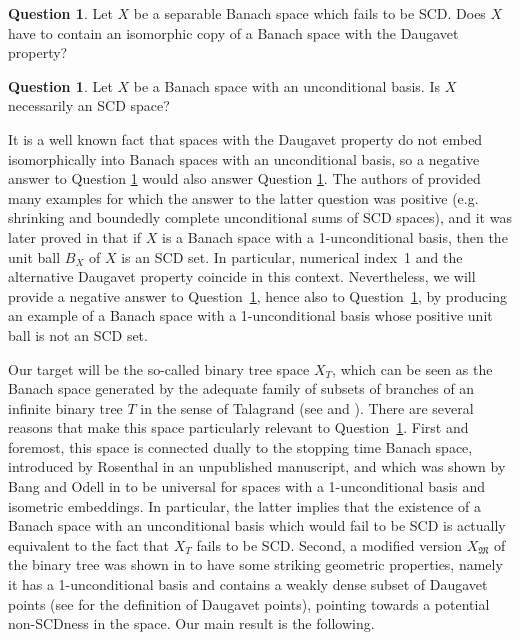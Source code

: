 \documentclass[11pt,a4paper,reqno]{amsart}
\numberwithin{equation}{section}
\newcommand{\1}{\mathbbm{1}}
\theoremstyle{plain}
\theoremstyle{definition}
\newtheorem{question}[theorem]{Question}
\begin{document}
\begin{question}\label{question:non_SCD_implies_isomorphic_copy_of_Daugavet_space}
    Let $X$ be a separable Banach space which fails to be SCD. Does $X$ have to contain an isomorphic copy of a Banach space with the Daugavet property?
\end{question}
\begin{question}\label{question:unconditional_basis_implies_SCD}
    Let $X$ be a Banach space with an unconditional basis. Is $X$ necessarily an SCD space? 
\end{question}
It is a well known fact that spaces with the Daugavet property do not embed isomorphically into Banach spaces with an unconditional basis, so a negative answer to Question \ref{question:unconditional_basis_implies_SCD} would also answer Question \ref{question:non_SCD_implies_isomorphic_copy_of_Daugavet_space}. The authors of \cite{AKMMS10} provided many examples for which the answer to the latter question was positive (e.g. shrinking and boundedly complete unconditional sums of SCD spaces), and it was later proved in \cite{KMMW2013} that if $X$ is a Banach space with a 1-unconditional basis, then the unit ball $B_X$ of $X$ is an SCD set. In particular, numerical index~1 and the alternative Daugavet property coincide in this context. Nevertheless, we will provide a negative answer to Question~\ref{question:unconditional_basis_implies_SCD}, hence also to Question~\ref{question:non_SCD_implies_isomorphic_copy_of_Daugavet_space}, by producing an example of a Banach space with a 1-unconditional basis whose positive unit ball is not an SCD set. 


Our target will be the so-called binary tree space $X_T$, which can be seen as the Banach space generated by the adequate family of subsets of branches of an infinite binary tree $T$ in the sense of Talagrand (see \cite{Tal79} and \cite{Tal84}). There are several reasons that make this space particularly relevant to Question~\ref{question:unconditional_basis_implies_SCD}. First and foremost, this space is connected dually to the stopping time Banach space, introduced by Rosenthal in an unpublished manuscript, and which was shown by Bang and Odell in \cite{BO89} to be universal for spaces with a 1-unconditional basis and isometric embeddings. In particular, the latter implies that the existence of a Banach space with an unconditional basis which would fail to be SCD is actually equivalent to the fact that $X_T$ fails to be SCD. Second, a modified version $X_\mathfrak{M}$ of the binary tree was shown in \cite{ALMT} to have some striking geometric properties, namely it has a 1-unconditional basis and contains a weakly dense subset of Daugavet points (see \cite{AHLP} for the definition of Daugavet points), pointing towards a potential non-SCDness in the space. Our main result is the following.
\end{document}
